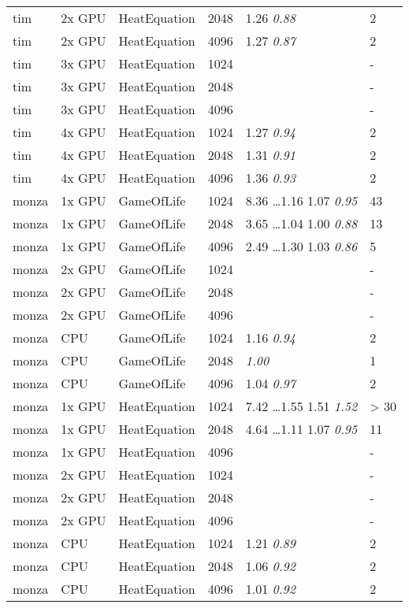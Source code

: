 \begin{tabular}{| l | l | l | l | l | l |}
tim & 2x GPU & HeatEquation & 2048 & 1.26 \textit{0.88} & 2 \\
tim & 2x GPU & HeatEquation & 4096 & 1.27 \textit{0.87} & 2 \\
tim & 3x GPU & HeatEquation & 1024 &  & - \\
tim & 3x GPU & HeatEquation & 2048 &  & - \\
tim & 3x GPU & HeatEquation & 4096 &  & - \\
tim & 4x GPU & HeatEquation & 1024 & 1.27 \textit{0.94} & 2 \\
tim & 4x GPU & HeatEquation & 2048 & 1.31 \textit{0.91} & 2 \\
tim & 4x GPU & HeatEquation & 4096 & 1.36 \textit{0.93} & 2 \\
monza & 1x GPU & GameOfLife & 1024 & 8.36 \ldots 1.16 1.07 \textit{0.95} & 43 \\
monza & 1x GPU & GameOfLife & 2048 & 3.65 \ldots 1.04 1.00 \textit{0.88} & 13 \\
monza & 1x GPU & GameOfLife & 4096 & 2.49 \ldots 1.30 1.03 \textit{0.86} & 5 \\
monza & 2x GPU & GameOfLife & 1024 &  & - \\
monza & 2x GPU & GameOfLife & 2048 &  & - \\
monza & 2x GPU & GameOfLife & 4096 &  & - \\
monza & CPU & GameOfLife & 1024 & 1.16 \textit{0.94} & 2 \\
monza & CPU & GameOfLife & 2048 & \textit{1.00} & 1 \\
monza & CPU & GameOfLife & 4096 & 1.04 \textit{0.97} & 2 \\
monza & 1x GPU & HeatEquation & 1024 & 7.42 \ldots 1.55 1.51 \textit{1.52} & > 30 \\
monza & 1x GPU & HeatEquation & 2048 & 4.64 \ldots 1.11 1.07 \textit{0.95} & 11 \\
monza & 1x GPU & HeatEquation & 4096 &  & - \\
monza & 2x GPU & HeatEquation & 1024 &  & - \\
monza & 2x GPU & HeatEquation & 2048 &  & - \\
monza & 2x GPU & HeatEquation & 4096 &  & - \\
monza & CPU & HeatEquation & 1024 & 1.21 \textit{0.89} & 2 \\
monza & CPU & HeatEquation & 2048 & 1.06 \textit{0.92} & 2 \\
monza & CPU & HeatEquation & 4096 & 1.01 \textit{0.92} & 2 \\
\hline
\end{tabular}
